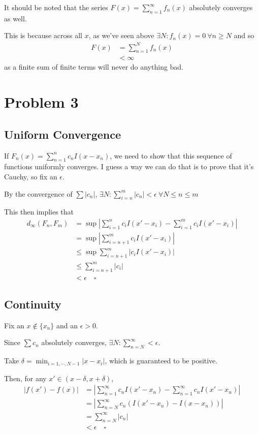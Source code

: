 \documentclass[12pt]{article}
\begin{document}
It should be noted that the series $F(x)=\sum_{n=1}^{\infty} f_n(x)$ absolutely converges as well.

This is because across all $x$, as we've seen above $\exists N: f_n(x)=0\ \forall n \ge N$ and so
\begin{align*}
  F(x)
   & = \sum_{n=1}^{N} f_n(x) \\
   & < \infty
\end{align*}
as a finite sum of finite terms will never do anything bad.

\pagebreak

\section{Problem 3}

\subsection{Uniform Convergence}

If $F_n(x)=\sum_{n=1}^{n} c_n I(x-x_n)$, we need to show that this sequence
of functions uniformly converges.
I guess a way we can do that is to prove that it's Cauchy, so fix an $\epsilon$.

By the convergence of $\sum |c_n|$,
$\exists N: \sum_{i=n}^{m} |c_n| < \epsilon\ \forall N \le n \le m$

This then implies that
\begin{align*}
  d_\infty(F_n, F_m)
  &= \sup \left|\sum_{i=1}^{n} c_i I(x'-x_i) - \sum_{i=1}^{m} c_iI(x'-x_i)\right| \\
  &= \sup \left|\sum_{i=n+1}^{m} c_i I(x'-x_i)\right| \\
  &\le \sup \sum_{i=n+1}^{m} |c_i I(x'-x_i)| \\
  &\le \sum_{i=n+1}^{m} |c_i| \\
  &< \epsilon\quad\square
\end{align*}

\subsection{Continuity}

Fix an $x \notin \{x_n\}$ and an $\epsilon > 0$.

Since $\sum c_n$ absolutely converges, $\exists N: \sum_{n=N}^{\infty} < \epsilon$.

Take $\delta=\min_{i=1, \cdots, N-1} |x-x_i|$, which is guaranteed to be positive.

Then, for any $x' \in (x-\delta, x+\delta)$,
\begin{align*}
  |f(x')-f(x)|
   & = \left|\sum_{n=1}^{\infty} c_nI(x'-x_n) - \sum_{n=1}^{\infty} c_nI(x'-x_n)\right| \\
   & = \left|\sum_{n=N}^{\infty} c_n(I(x'-x_n) - I(x-x_n))\right|                       \\
   & = \sum_{n=N}^{\infty} |c_n|                                                        \\
   & < \epsilon\quad\square
\end{align*}
\end{document}
